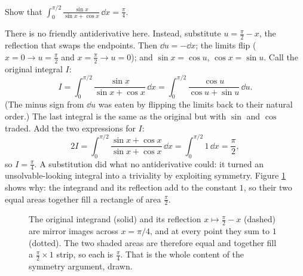 \begin{example}
\label{ch22:ex-symmetry}
Show that $\displaystyle \int_0^{\pi/2} \frac{\sin x}{\sin x + \cos x}\,\dd x =
\frac{\pi}{4}$.

There is no friendly antiderivative here. Instead, substitute $u = \tfrac{\pi}{2} -
x$, the reflection that swaps the endpoints. Then $\dd u = -\dd x$; the limits flip
($x=0\!\to\!u=\tfrac\pi2$ and $x=\tfrac\pi2\!\to\!u=0$); and $\sin x = \cos u$,
$\cos x = \sin u$. Call the original integral $I$:
\[
  I = \int_0^{\pi/2}\frac{\sin x}{\sin x+\cos x}\,\dd x
    = \int_0^{\pi/2}\frac{\cos u}{\cos u + \sin u}\,\dd u.
\]
(The minus sign from $\dd u$ was eaten by flipping the limits back to their natural
order.) The last integral is the same as the original but with $\sin$ and $\cos$
traded. Add the two expressions for $I$:
\[
  2I = \int_0^{\pi/2}\frac{\sin x + \cos x}{\sin x + \cos x}\,\dd x
     = \int_0^{\pi/2} 1\,\dd x = \frac{\pi}{2},
\]
so $I = \tfrac{\pi}{4}$. A substitution did what no antiderivative could: it turned
an unsolvable-looking integral into a triviality by exploiting symmetry. Figure
\ref{ch22:fig-symmetry} shows why: the integrand and its reflection add to the
constant $1$, so their two equal areas together fill a rectangle of area
$\tfrac\pi2$.
\end{example}

\begin{figure}[H]
\centering
{}
\caption{The original integrand (solid) and its reflection $x\mapsto\tfrac{\pi}{2}-x$
(dashed) are mirror images across $x=\pi/4$, and at every point they sum to $1$
(dotted). The two shaded areas are therefore equal and together fill a
$\tfrac\pi2\times 1$ strip, so each is $\tfrac\pi4$. That is the whole content of the
symmetry argument, drawn.}
\label{ch22:fig-symmetry}
\end{figure}

